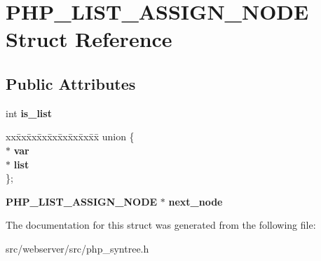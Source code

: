\section{PHP\_\-LIST\_\-ASSIGN\_\-NODE Struct Reference}
\label{structPHP__LIST__ASSIGN__NODE}
\subsection*{Public Attributes}
\begin{DoxyCompactItemize}
\item 
int {\bfseries is\_\-list}\label{structPHP__LIST__ASSIGN__NODE_a36e67ae7f5e8bb4ea699213288383015}

\item 
\begin{tabbing}
xx\=xx\=xx\=xx\=xx\=xx\=xx\=xx\=xx\=\kill
union \{\\
 $\ast$ {\bfseries var}\\
 $\ast$ {\bfseries list}\\
\}; \label{structPHP__LIST__ASSIGN__NODE_acb51fcd64f591f3a1116abb974f04c90}
\\

\end{tabbing}\item 
{\bf PHP\_\-LIST\_\-ASSIGN\_\-NODE} $\ast$ {\bfseries next\_\-node}\label{structPHP__LIST__ASSIGN__NODE_a783b3938527c4764283adb12542531dc}

\end{DoxyCompactItemize}


The documentation for this struct was generated from the following file:\begin{DoxyCompactItemize}
\item 
src/webserver/src/php\_\-syntree.h\end{DoxyCompactItemize}
